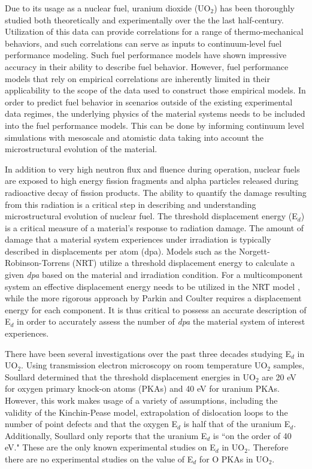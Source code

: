 \documentclass[review]{elsarticle}
\begin{document}
\hspace{5mm}
Due to its usage as a nuclear fuel, uranium dioxide (UO$_2$) has been thoroughly studied both theoretically and experimentally over the the last half-century. Utilization of this data can provide correlations for a range of thermo-mechanical behaviors, and such correlations can serve as inputs to continuum-level fuel performance modeling. Such fuel performance models \cite{williamson_et_al_2012, falcon04, bentejac2004, thouvenin2007, sercombe2009} have shown impressive accuracy in their ability to describe fuel behavior. However, fuel performance models that rely on empirical correlations are inherently limited in their applicability to the scope of the data used to construct those empirical models. In order to predict fuel behavior in scenarios outside of the existing experimental data regimes, the underlying physics of the material systems needs to be included into the fuel performance models. This can be done by informing continuum level simulations with mesoscale and atomistic data taking into account the microstructural evolution of the material.

In addition to very high neutron flux and fluence during operation, nuclear fuels are exposed to high energy fission fragments and alpha particles released during radioactive decay of fission products. The ability to quantify the damage resulting from this radiation is a critical step in describing and understanding microstructural evolution of nuclear fuel. The threshold displacement energy (E$_d$) is a critical measure of a material's response to radiation damage. The amount of damage that a material system experiences under irradiation is typically described in displacements per atom (dpa). Models such as the Norgett-Robinson-Torrens (NRT) \cite{nrt} utilize a threshold displacement energy to calculate a given \textit{dpa} based on the material and irradiation condition. For a multicomponent system an effective displacement energy needs to be utilized in the NRT model \cite{crocombette2016}, while the more rigorous approach by Parkin and Coulter \cite{PC1980} requires a displacement energy for each component. It is thus critical to possess an accurate description of E$_d$ in order to accurately assess the number of \textit{dpa} the material system of interest experiences.

There have been several investigations over the past three decades studying E$_d$ in UO$_2$. Using transmission electron microscopy on room temperature UO$_2$ samples, Soullard \cite{soullard1977,soullard1985} determined that the threshold displacement energies in UO$_2$ are 20 eV for oxygen primary knock-on atoms (PKAs) and 40 eV for uranium PKAs. However, this work makes usage of a variety of assumptions, including the validity of the Kinchin-Pease model, extrapolation of dislocation loops to the number of point defects and that the oxygen E$_d$ is half that of the uranium E$_d$. Additionally, Soullard only reports that the uranium E$_d$ is ``on the order of 40 eV." These are the only known experimental studies on E$_d$ in UO$_2$. Therefore there are no experimental studies on the value of E$_d$ for O PKAs in UO$_2$.
\end{document}
